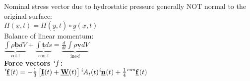Nominal stress vector due to hydrostatic pressure generally NOT normal to the original surface: \\
$\Pi (\underline{x},t) = \Pi (\underline{y},t) \circ \underline{y} (\underline{x},t)$ \\

Balance of linear momentum: \\
$\underbrace{\int \rho \underline{\mathbf{b}} d V}_{\text{vol-f}} + \underbrace{\int \underline{\mathbf{t}} ds}_{\text{con-f}}  = \underbrace{\frac{d}{dt} \int \rho \underline{\mathbf{v}} dV}_{\text{ine-f}} $ \\

\textbf{Force vectors $\tensor[^i]{f}{}$:} \\
$\tensor[^i]{\underline{\mathbf{f}}}{}(t) = - \frac{1}{3} \left[ \underline{\mathbf{I}}(t) + \underline{\mathbf{W}}(t) \right] \tensor[^i]{A}{_t}(t) \tensor[^i]{\underline{\mathbf{n}}}{}(t) + \frac{1}{4} \tensor[^{con}]{\underline{\mathbf{f}}}{}(t)$ \\